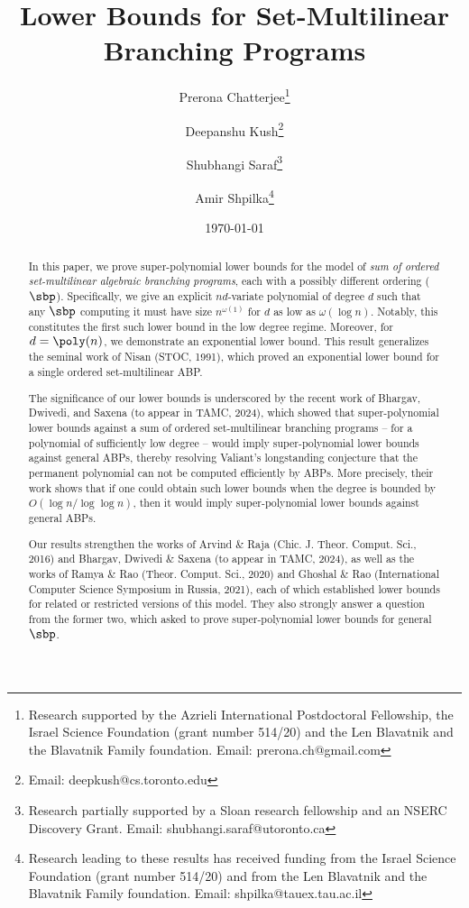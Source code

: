 \documentclass{article}
\title{Lower Bounds for Set-Multilinear Branching Programs}
\author[1]{Prerona Chatterjee\footnote{Research supported by the Azrieli International Postdoctoral Fellowship, the Israel Science Foundation (grant number 514/20) and the Len Blavatnik and the Blavatnik Family foundation. Email: prerona.ch@gmail.com}}
\author[2]{Deepanshu Kush\footnote{Email: deepkush@cs.toronto.edu}}
\author[2,3]{Shubhangi Saraf\footnote{Research partially supported by a Sloan research fellowship and an NSERC Discovery Grant. Email: shubhangi.saraf@utoronto.ca}}
\author[1]{Amir Shpilka\footnote{Research leading to these results has received funding from the  Israel Science Foundation (grant number 514/20) and from the Len Blavatnik and the Blavatnik Family foundation. Email: shpilka@tauex.tau.ac.il}}
\affil[1]{Blavatnik School of Computer Science, Tel-Aviv University}
\affil[2]{Department of Computer Science, University of Toronto}
\affil[3]{Department of Mathematics, University of Toronto}
\date{\today}
\begin{document}
\maketitle

\begin{abstract}
   
In this paper, we prove super-polynomial lower bounds for the model of \emph{sum of ordered set-multilinear algebraic branching programs}, each with a possibly different ordering ($\sbp$). 
Specifically, we give an explicit $nd$-variate polynomial of degree $d$ such that any $\sbp$ computing it must have size $n^{\omega(1)}$ for $d$ as low as $\omega(\log n)$. Notably, this constitutes the first such lower bound in the low degree regime. Moreover, for $d = \poly(n)$, we demonstrate an exponential lower bound.
This result generalizes the seminal work of Nisan (STOC, 1991), which proved an exponential lower bound for a single ordered set-multilinear ABP. 


The significance of our lower bounds is underscored by the recent work of Bhargav, Dwivedi, and Saxena (to appear in TAMC, 2024), which showed that super-polynomial lower bounds against a sum of ordered set-multilinear branching programs -- for a polynomial of sufficiently low degree -- would imply super-polynomial lower bounds against general ABPs, thereby resolving Valiant's longstanding conjecture that the permanent polynomial can not be computed efficiently by ABPs. 
More precisely, their work shows that if one could obtain such lower bounds when the degree is bounded by $O(\log n/ \log \log n)$, then it would imply super-polynomial lower bounds against general ABPs. 

Our results strengthen the works of Arvind \& Raja (Chic. J. Theor. Comput. Sci., 2016) and Bhargav, Dwivedi \& Saxena (to appear in TAMC, 2024), as well as the works of Ramya \& Rao (Theor. Comput. Sci., 2020) and Ghoshal \& Rao (International Computer Science Symposium in Russia, 2021), each of which established lower bounds for related or restricted versions of this model.
They also strongly answer a question from the former two, which asked to prove super-polynomial lower bounds for general $\sbp$.  


\end{abstract}
\end{document}
